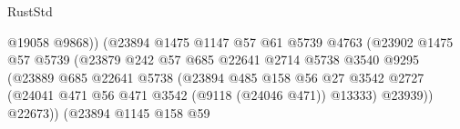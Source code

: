 \begin{lexlean}{RustStd}
\begin{coremodule}
                                                @19058
                                                @9868))
                                            (@23894
                                              @1475
                                              @1147
                                              @57
                                              @61
                                              @5739
                                              @4763
                                              (@23902
                                                @1475
                                                @57
                                                @5739
                                                (@23879
                                                  @242
                                                  @57
                                                  @685
                                                  @22641
                                                  @2714
                                                  @5738
                                                  @3540
                                                  @9295
                                                  (@23889
                                                    @685
                                                    @22641
                                                    @5738
                                                    (@23894
                                                      @485
                                                      @158
                                                      @56
                                                      @27
                                                      @3542
                                                      @2727
                                                      (@24041
                                                        @471
                                                        @56
                                                        @471
                                                        @3542
                                                        (@9118 (@24046 @471))
                                                        @13333)
                                                      @23939))
                                                  @22673))
                                              (@23894
                                                @1145
                                                @158
                                                @59

\end{coremodule}
\end{lexlean}

